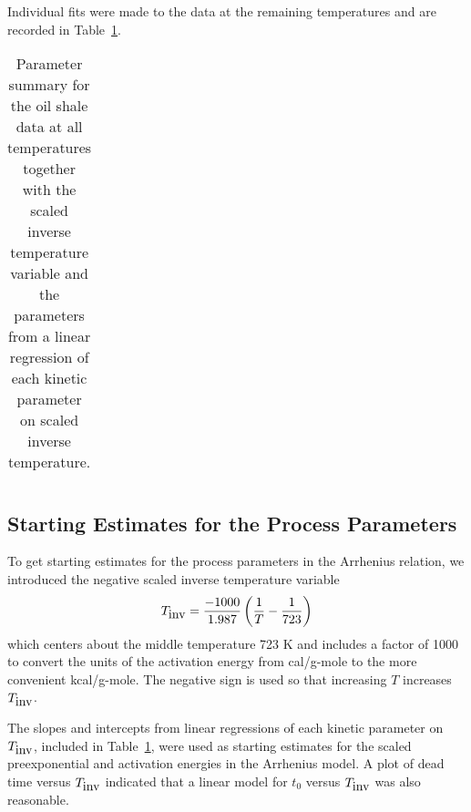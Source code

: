 Individual fits were made to the data at the remaining temperatures
and are recorded in
Table~\ref{tbl:alltemp}.
\begin{table}
  \caption{\label{tbl:alltemp}
  Parameter summary for the oil shale data at all temperatures together
  with the scaled inverse temperature variable and the parameters
  from a linear regression of each kinetic parameter on scaled inverse
  temperature.
  }
  \begin{tabular}{l r r r r r}
  \end{tabular}
\end{table}

\subsection{Starting Estimates for the Process Parameters}

To get starting estimates for the process parameters in the
Arrhenius relation, we introduced the negative scaled inverse
temperature variable
\begin{displaymath}
  T_{\mbox{\rm inv} }=\frac{-1000}{1.987}\left(\frac{1}{T}-\frac{1}{723}\right)
\end{displaymath}
which centers about the middle temperature 723 K and
includes a factor of 1000 to convert
the units of the activation energy from cal/g-mole to the more
convenient kcal/g-mole.
The negative sign is used so that increasing $T$ increases
$T_{\mbox{\rm inv}}$.

The slopes and intercepts from linear regressions of each
kinetic parameter on $T_{\mbox{\rm inv}}$, included in Table~\ref{tbl:alltemp},
were used as starting estimates for the scaled
preexponential and activation energies in the Arrhenius model.
A plot of dead time versus $T_{\mbox{\rm inv}}$ indicated that a linear
model for $t_{0}$ versus $T_{\mbox{\rm inv}}$ was also reasonable.

